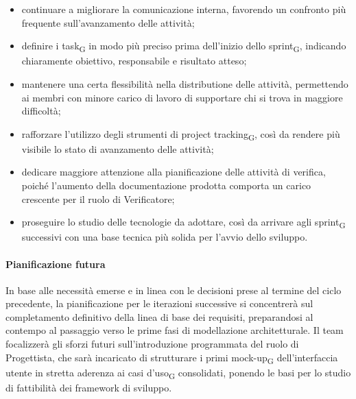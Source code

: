 ﻿\documentclass[a4paper, 10pt, colorlinks=true, linkcolor=black, urlcolor=blue, citecolor=blue, hidelinks]{article}
\begin{document}
\begin{itemize}
    \item continuare a migliorare la comunicazione interna, favorendo un confronto più frequente sull'avanzamento delle attività;

    \item definire i task\textsubscript{G} in modo più preciso prima dell'inizio dello sprint\textsubscript{G}, indicando chiaramente obiettivo, responsabile e risultato atteso;

    \item mantenere una certa flessibilità nella distributione delle attività, permettendo ai membri con minore carico di lavoro di supportare chi si trova in maggiore difficoltà;

    \item rafforzare l'utilizzo degli strumenti di project tracking\textsubscript{G}, così da rendere più visibile lo stato di avanzamento delle attività;

    \item dedicare maggiore attenzione alla pianificazione delle attività di verifica, poiché l'aumento della documentazione prodotta comporta un carico crescente per il ruolo di Verificatore;

    \item proseguire lo studio delle tecnologie da adottare, così da arrivare agli sprint\textsubscript{G} successivi con una base tecnica più solida per l'avvio dello sviluppo.
\end{itemize}

\paragraph{Pianificazione futura}
In base alle necessità emerse e in linea con le decisioni prese al termine del ciclo precedente, la pianificazione per le iterazioni successive si concentrerà sul completamento definitivo della linea di base dei requisiti, preparandosi al contempo al passaggio verso le prime fasi di modellazione architetturale. Il team focalizzerà gli sforzi futuri sull'introduzione programmata del ruolo di Progettista, che sarà incaricato di strutturare i primi mock-up\textsubscript{G} dell'interfaccia utente in stretta aderenza ai casi d'uso\textsubscript{G} consolidati, ponendo le basi per lo studio di fattibilità dei framework di sviluppo.
\end{document}
